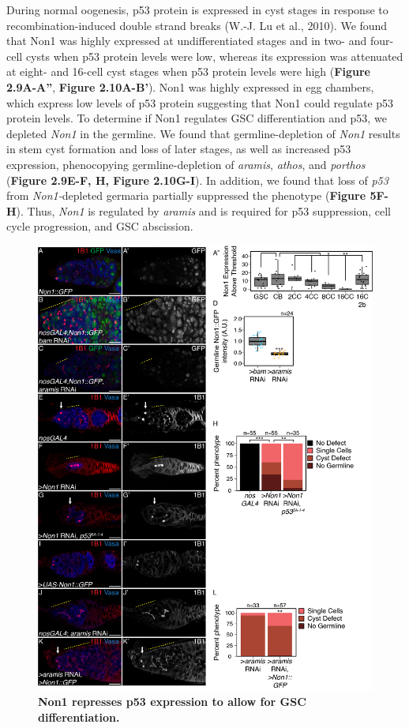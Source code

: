 \documentclass[12pt,oneside]{reedthesis}
\begin{document}
During normal oogenesis, p53 protein is expressed in cyst stages in response to recombination-induced double strand breaks (W.-J. Lu et al., 2010). We found that Non1 was highly expressed at undifferentiated stages and in two- and four-cell cysts when p53 protein levels were low, whereas its expression was attenuated at eight- and 16-cell cyst stages when p53 protein levels were high (\textbf{Figure 2.9A-A''}, \textbf{Figure 2.10A-B'}). Non1 was highly expressed in egg chambers, which express low levels of p53 protein suggesting that Non1 could regulate p53 protein levels. To determine if Non1 regulates GSC differentiation and p53, we depleted \emph{Non1} in the germline. We found that germline-depletion of \emph{Non1} results in stem cyst formation and loss of later stages, as well as increased p53 expression, phenocopying germline-depletion of \emph{aramis}, \emph{athos}, and \emph{porthos} (\textbf{Figure 2.9E-F, H, Figure 2.10G-I}). In addition, we found that loss of \emph{p53} from \emph{Non1-}depleted germaria partially suppressed the phenotype (\textbf{Figure 5F-H}). Thus, \emph{Non1} is regulated by \emph{aramis} and is required for p53 suppression, cell cycle progression, and GSC abscission.
\begin{figure}

{\centering \includegraphics[width=1\linewidth]{./figure/Ribosome Biogenesis/Ribosome Biogenesis 5} 

}

\caption[\textbf{Non1 represses p53 expression to allow for GSC differentiation.}]{\textbf{Non1 represses p53 expression to allow for GSC differentiation.}}\label{fig:unnamed-chunk-16}
\end{figure}
\end{document}
